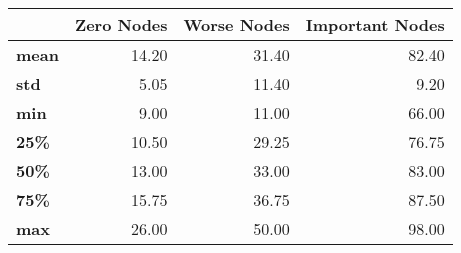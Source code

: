 \begin{tabular}{lrrr}
\toprule
{} &  Zero Nodes &  Worse Nodes &  Important Nodes \\
\midrule
\textbf{mean} &       14.20 &        31.40 &            82.40 \\
\textbf{std } &        5.05 &        11.40 &             9.20 \\
\textbf{min } &        9.00 &        11.00 &            66.00 \\
\textbf{25\% } &       10.50 &        29.25 &            76.75 \\
\textbf{50\% } &       13.00 &        33.00 &            83.00 \\
\textbf{75\% } &       15.75 &        36.75 &            87.50 \\
\textbf{max } &       26.00 &        50.00 &            98.00 \\
\bottomrule
\end{tabular}
